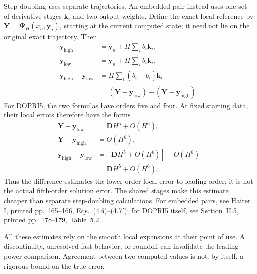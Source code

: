 Step doubling uses separate trajectories. An embedded pair instead uses
one set of derivative stages $\mathbf k_i$ and two output weights. Define the
exact local reference by $\mathbf Y=\boldsymbol\Psi_H(x_n,\mathbf y_n)$,
starting at the current computed state; it need not lie on the original exact
trajectory. Then
\begin{equation}\label{Eq:RichEmbeddedBridge}
\begin{aligned}
 \mathbf y_{\mathrm{high}}&=\mathbf y_n+H\sum_i b_i\mathbf k_i,\\
 \mathbf y_{\mathrm{low}}&=\mathbf y_n+H\sum_i\widetilde b_i\mathbf k_i,\\
 \mathbf y_{\mathrm{high}}-\mathbf y_{\mathrm{low}}
 &=H\sum_i(b_i-\widetilde b_i)\mathbf k_i\\
 &=(\mathbf Y-\mathbf y_{\mathrm{low}})
   -(\mathbf Y-\mathbf y_{\mathrm{high}}).
\end{aligned}
\end{equation}
For DOPRI5, the two formulas have orders five and four. At fixed starting
data, their local errors therefore have the forms
\[
\begin{aligned}
 \mathbf Y-\mathbf y_{\mathrm{low}}&=\mathbf D H^5+O(H^6),\\
 \mathbf Y-\mathbf y_{\mathrm{high}}&=O(H^6),\\
 \mathbf y_{\mathrm{high}}-\mathbf y_{\mathrm{low}}
 &=[\mathbf D H^5+O(H^6)]-O(H^6)\\
 &=\mathbf D H^5+O(H^6).
\end{aligned}
\]
Thus the difference estimates the lower-order local error to leading order;
it is not the actual fifth-order solution error. The shared stages make this
estimate cheaper than separate step-doubling calculations. For embedded pairs,
see Hairer I, printed pp.~165--166, Eqs.~(4.6)--(4.7$'$); for DOPRI5 itself,
see Section~II.5, printed pp.~178--179, Table~5.2 \cite{HNW1993}.

All these estimates rely on the smooth local expansions at their point of use.
A discontinuity, unresolved fast behavior, or roundoff can invalidate the leading
power comparison. Agreement between two computed values is not, by itself,
a rigorous bound on the true error.

